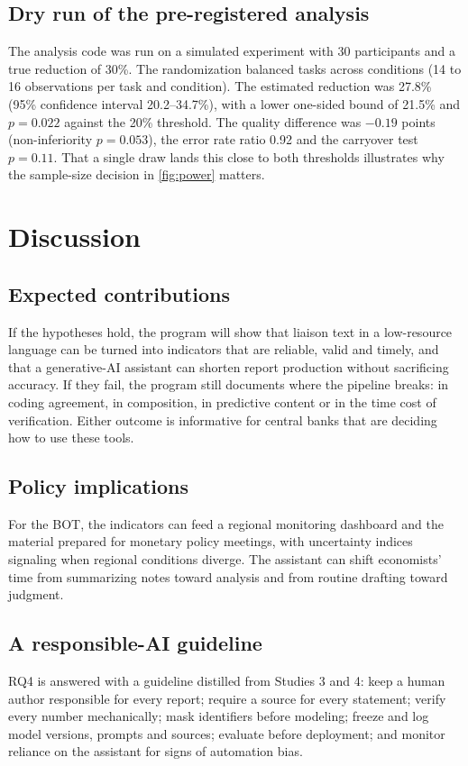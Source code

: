 \documentclass[11pt]{article}
\begin{document}
\subsection{Dry run of the pre-registered analysis}
The analysis code was run on a simulated experiment with 30 participants and a true reduction of 30\%. The randomization balanced tasks across conditions (14 to 16 observations per task and condition). The estimated reduction was 27.8\% (95\% confidence interval 20.2--34.7\%), with a lower one-sided bound of 21.5\% and $p = 0.022$ against the 20\% threshold. The quality difference was $-0.19$ points (non-inferiority $p = 0.053$), the error rate ratio 0.92 and the carryover test $p = 0.11$. That a single draw lands this close to both thresholds illustrates why the sample-size decision in \cref{fig:power} matters.

\section{Discussion}\label{sec:discussion}

\subsection{Expected contributions}
If the hypotheses hold, the program will show that liaison text in a low-resource language can be turned into indicators that are reliable, valid and timely, and that a generative-AI assistant can shorten report production without sacrificing accuracy. If they fail, the program still documents where the pipeline breaks: in coding agreement, in composition, in predictive content or in the time cost of verification. Either outcome is informative for central banks that are deciding how to use these tools.

\subsection{Policy implications}
For the BOT, the indicators can feed a regional monitoring dashboard and the material prepared for monetary policy meetings, with uncertainty indices signaling when regional conditions diverge. The assistant can shift economists' time from summarizing notes toward analysis and from routine drafting toward judgment.

\subsection{A responsible-AI guideline}
RQ4 is answered with a guideline distilled from Studies 3 and 4: keep a human author responsible for every report; require a source for every statement; verify every number mechanically; mask identifiers before modeling; freeze and log model versions, prompts and sources; evaluate before deployment; and monitor reliance on the assistant for signs of automation bias.
\end{document}
